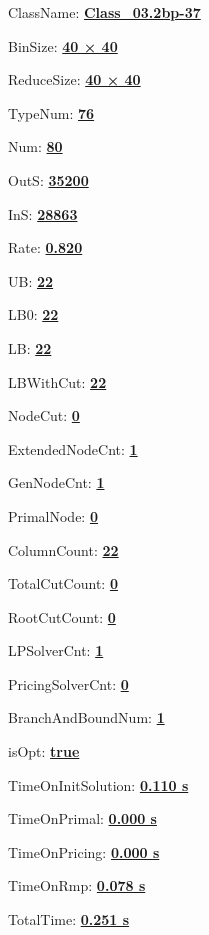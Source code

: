 \documentclass[11pt]{article}
\begin{document}
\pagestyle{empty}


ClassName: \underline{\textbf{Class_03.2bp-37}}
\par
BinSize: \underline{\textbf{40 × 40}}
\par
ReduceSize: \underline{\textbf{40 × 40}}
\par
TypeNum: \underline{\textbf{76}}
\par
Num: \underline{\textbf{80}}
\par
OutS: \underline{\textbf{35200}}
\par
InS: \underline{\textbf{28863}}
\par
Rate: \underline{\textbf{0.820}}
\par
UB: \underline{\textbf{22}}
\par
LB0: \underline{\textbf{22}}
\par
LB: \underline{\textbf{22}}
\par
LBWithCut: \underline{\textbf{22}}
\par
NodeCut: \underline{\textbf{0}}
\par
ExtendedNodeCnt: \underline{\textbf{1}}
\par
GenNodeCnt: \underline{\textbf{1}}
\par
PrimalNode: \underline{\textbf{0}}
\par
ColumnCount: \underline{\textbf{22}}
\par
TotalCutCount: \underline{\textbf{0}}
\par
RootCutCount: \underline{\textbf{0}}
\par
LPSolverCnt: \underline{\textbf{1}}
\par
PricingSolverCnt: \underline{\textbf{0}}
\par
BranchAndBoundNum: \underline{\textbf{1}}
\par
isOpt: \underline{\textbf{true}}
\par
TimeOnInitSolution: \underline{\textbf{0.110 s}}
\par
TimeOnPrimal: \underline{\textbf{0.000 s}}
\par
TimeOnPricing: \underline{\textbf{0.000 s}}
\par
TimeOnRmp: \underline{\textbf{0.078 s}}
\par
TotalTime: \underline{\textbf{0.251 s}}
\par
\newpage


\end{document}
